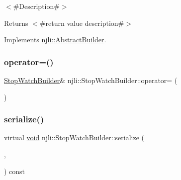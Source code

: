 $<$\#\+Description\#$>$

\begin{DoxyReturn}{Returns}
$<$\#return value description\#$>$ 
\end{DoxyReturn}


Implements \mbox{\hyperlink{classnjli_1_1_abstract_builder_a3e6e553e06d1ca30517ad5fb0bd4d000}{njli\+::\+Abstract\+Builder}}.

\mbox{\label{classnjli_1_1_stop_watch_builder_ad3650557eb0211a3630c68582fef4721}} 
\subsubsection{\texorpdfstring{operator=()}{operator=()}}
{\footnotesize\ttfamily \mbox{\hyperlink{classnjli_1_1_stop_watch_builder}{Stop\+Watch\+Builder}}\& njli\+::\+Stop\+Watch\+Builder\+::operator= (\begin{DoxyParamCaption}\item[{const \mbox{\hyperlink{classnjli_1_1_stop_watch_builder}{Stop\+Watch\+Builder}} \&}]{ }\end{DoxyParamCaption})\hspace{0.3cm}{\ttfamily [protected]}}

\mbox{\label{classnjli_1_1_stop_watch_builder_a4d6eef341617c4aaef84da6353c06774}} 
\subsubsection{\texorpdfstring{serialize()}{serialize()}}
{\footnotesize\ttfamily virtual \mbox{\hyperlink{_thread_8h_af1e856da2e658414cb2456cb6f7ebc66}{void}} njli\+::\+Stop\+Watch\+Builder\+::serialize (\begin{DoxyParamCaption}\item[{\mbox{\hyperlink{_thread_8h_af1e856da2e658414cb2456cb6f7ebc66}{void}} $\ast$}]{,  }\item[{bt\+Serializer $\ast$}]{ }\end{DoxyParamCaption}) const\hspace{0.3cm}{\ttfamily [virtual]}}

